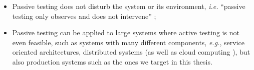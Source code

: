 \begin{itemize}
    \item Passive testing does not disturb the system or its
        environment, \emph{i.e.} \enquote{passive testing only
        observes and does not intervene} \cite{cavalli2003new};

    \item Passive testing can be applied to large systems where
        active testing is not even feasible, such as systems with
        many different components, \emph{e.g.}, service oriented
        architectures, distributed systems (as well as cloud
        computing \cite{cavalli2015survey}), but also production
        systems such as the ones we target in this thesis.
\end{itemize}
